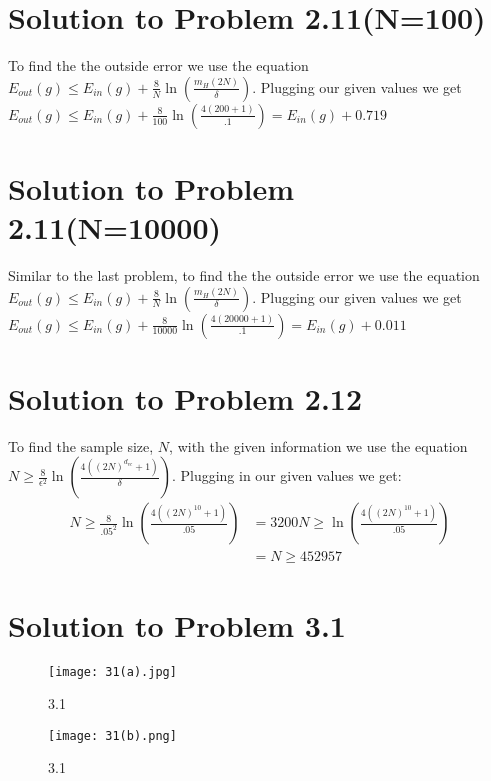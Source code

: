 \documentclass[a4paper]{article}
\begin{document}
\section{Solution to Problem 2.11(N=100)}
To find the the outside error we use the equation $E_{out}(g) \le E_{in}(g) + \frac{8}{N}\ln(\frac{m_H(2N)}{\delta})$.
Plugging our given values we get $E_{out}(g) \le E_{in}(g) + \frac{8}{100}\ln(\frac{4(200+1)}{.1}) = E_{in}(g) + 0.719$


\section{Solution to Problem 2.11(N=10000)}
Similar to the last problem, to find the the outside error we use the equation $E_{out}(g) \le E_{in}(g) + \frac{8}{N}\ln(\frac{m_H(2N)}{\delta})$.
Plugging our given values we get $E_{out}(g) \le E_{in}(g) + \frac{8}{10000}\ln(\frac{4(20000+1)}{.1}) = E_{in}(g) + 0.011$

\section{Solution to Problem 2.12}
To find the sample size, $N$, with the given information we use the equation $N \ge \frac{8}{\epsilon^2}\ln(\frac{4((2N)^{d_{vc}}+1)}{\delta})$.
Plugging in our given values we get:
\begin{align}
N \ge \frac{8}{.05^2}\ln(\frac{4((2N)^10+1)}{.05}) &= 3200N \ge \ln(\frac{4((2N)^10+1)}{.05}) \\
&= N \ge 452957
\end{align}

\section{Solution to Problem 3.1}
\begin{figure}
  \texttt{[image: 31(a).jpg]}
  \caption{3.1}
  \label{fig:3.1(a)}
\end{figure}

\begin{figure}
  \texttt{[image: 31(b).png]}
  \caption{3.1}
  \label{fig:3.1(b)}
\end{figure}
\end{document}
